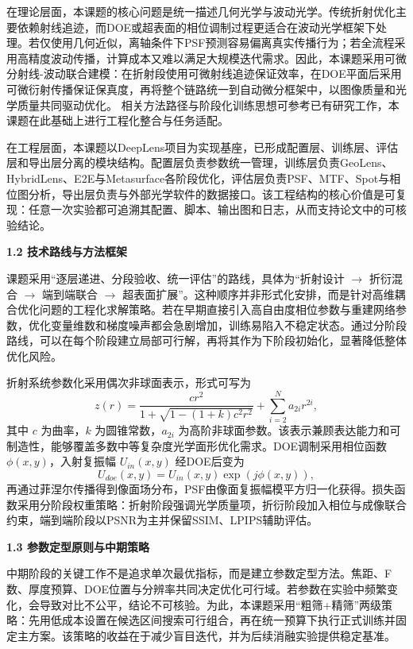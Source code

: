 \documentclass[UTF8,12pt,fontset=fandol]{ctexart}
\newcommand{\hfirst}[1]{%
\vspace{0.6em}
\noindent\textbf{#1}\par
}
\begin{document}
在理论层面，本课题的核心问题是统一描述几何光学与波动光学。传统折射优化主要依赖射线追迹，而DOE或超表面的相位调制过程更适合在波动光学框架下处理。若仅使用几何近似，离轴条件下PSF预测容易偏离真实传播行为；若全流程采用高精度波动传播，计算成本又难以满足大规模迭代需求。因此，本课题采用可微分射线-波动联合建模：在折射段使用可微射线追迹保证效率，在DOE平面后采用可微衍射传播保证保真度，再将整个链路统一到自动微分框架中，以图像质量和光学质量共同驱动优化。
相关方法路径与阶段化训练思想可参考已有研究工作\cite{yang2024curriculum,yang2024endtoend}，本课题在此基础上进行工程化整合与任务适配。

在工程层面，本课题以DeepLens项目为实现基座，已形成配置层、训练层、评估层和导出层分离的模块结构。配置层负责参数统一管理，训练层负责GeoLens、HybridLens、E2E与Metasurface各阶段优化，评估层负责PSF、MTF、Spot与相位图分析，导出层负责与外部光学软件的数据接口。该工程结构的核心价值是可复现：任意一次实验都可追溯其配置、脚本、输出图和日志，从而支持论文中的可核验结论。

\hfirst{1.2 技术路线与方法框架}
课题采用“逐层递进、分段验收、统一评估”的路线，具体为“折射设计 $\rightarrow$ 折衍混合 $\rightarrow$ 端到端联合 $\rightarrow$ 超表面扩展”。这种顺序并非形式化安排，而是针对高维耦合优化问题的工程化求解策略。若在早期直接引入高自由度相位参数与重建网络参数，优化变量维数和梯度噪声都会急剧增加，训练易陷入不稳定状态。通过分阶段路线，可以在每个阶段建立局部可行解，再将其作为下阶段初始化，显著降低整体优化风险。

折射系统参数化采用偶次非球面表示，形式可写为
\begin{equation}
z(r)=\frac{cr^2}{1+\sqrt{1-(1+k)c^2r^2}}+\sum_{i=2}^{N}a_{2i}r^{2i},
\end{equation}
其中 $c$ 为曲率，$k$ 为圆锥常数，$a_{2i}$ 为高阶非球面参数。该表示兼顾表达能力和可制造性，能够覆盖多数中等复杂度光学面形优化需求。DOE调制采用相位函数 $\phi(x,y)$，入射复振幅 $U_{in}(x,y)$ 经DOE后变为
\begin{equation}
U_{doe}(x,y)=U_{in}(x,y)\exp\left(j\phi(x,y)\right),
\end{equation}
再通过菲涅尔传播得到像面场分布，PSF由像面复振幅模平方归一化获得。损失函数采用分阶段权重策略：折射阶段强调光学质量项，折衍阶段加入相位与成像联合约束，端到端阶段以PSNR为主并保留SSIM、LPIPS辅助评估。

\hfirst{1.3 参数定型原则与中期策略}
中期阶段的关键工作不是追求单次最优指标，而是建立参数定型方法。焦距、F数、厚度预算、DOE位置与分辨率共同决定优化可行域。若参数在实验中频繁变化，会导致对比不公平，结论不可核验。为此，本课题采用“粗筛+精筛”两级策略：先用低成本设置在候选区间搜索可行组合，再在统一预算下执行正式训练并固定主方案。该策略的收益在于减少盲目迭代，并为后续消融实验提供稳定基准。
\end{document}
